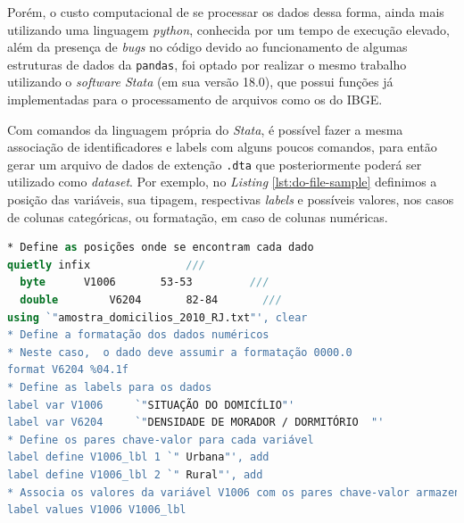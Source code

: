     Porém, o custo computacional de se processar os dados dessa forma, ainda mais utilizando uma linguagem \textit{python}, conhecida por um tempo de execução elevado, além da presença de \textit{bugs} no código devido ao funcionamento de algumas estruturas de dados da \verb|pandas|, foi optado por realizar o mesmo trabalho utilizando o \textit{software Stata} (em sua versão 18.0), que possui funções já implementadas para o processamento de arquivos como os do IBGE.

    Com comandos da linguagem própria do \textit{Stata}, é possível fazer a mesma associação de identificadores e labels com alguns poucos comandos, para então gerar um arquivo de dados de extenção \verb|.dta| que posteriormente poderá ser utilizado como \textit{dataset}. Por exemplo, no \textit{Listing} \ref{lst:do-file-sample} definimos a posição das variáveis, sua tipagem, respectivas \textit{labels} e possíveis valores, nos casos de colunas categóricas, ou formatação, em caso de colunas numéricas.


\begin{lstlisting}[float = ht, label={lst:do-file-sample},language=Stata, caption=Exemplo de comandos Stata utilizados para``traduzir'' os microdados.]
* Define as posições onde se encontram cada dado
quietly infix               ///
  byte		V1006		53-53		  ///
  double		V6204		82-84		///
using `"amostra_domicilios_2010_RJ.txt"', clear
* Define a formatação dos dados numéricos
* Neste caso,  o dado deve assumir a formatação 0000.0
format V6204 %04.1f
* Define as labels para os dados
label var V1006		`"SITUAÇÃO DO DOMICÍLIO"'
label var V6204		`"DENSIDADE DE MORADOR / DORMITÓRIO  "'
* Define os pares chave-valor para cada variável
label define V1006_lbl 1 `" Urbana"', add
label define V1006_lbl 2 `" Rural"', add
* Associa os valores da variável V1006 com os pares chave-valor armazenados em V1006_lbl
label values V1006 V1006_lbl
\end{lstlisting}

